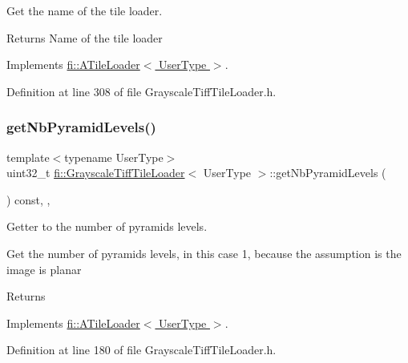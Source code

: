 Get the name of the tile loader. 

\begin{DoxyReturn}{Returns}
Name of the tile loader 
\end{DoxyReturn}


Implements \hyperlink{classfi_1_1ATileLoader_abb4cad235d57fbfb29ff5d37caf32a62}{fi\+::\+A\+Tile\+Loader$<$ User\+Type $>$}.



Definition at line 308 of file Grayscale\+Tiff\+Tile\+Loader.\+h.

\mbox{\label{classfi_1_1GrayscaleTiffTileLoader_a3a915d36a8c88a687b04ee8d5a15ecb0}} 
\subsubsection{\texorpdfstring{get\+Nb\+Pyramid\+Levels()}{getNbPyramidLevels()}}
{\footnotesize\ttfamily template$<$typename User\+Type$>$ \\
uint32\+\_\+t \hyperlink{classfi_1_1GrayscaleTiffTileLoader}{fi\+::\+Grayscale\+Tiff\+Tile\+Loader}$<$ User\+Type $>$\+::get\+Nb\+Pyramid\+Levels (\begin{DoxyParamCaption}{ }\end{DoxyParamCaption}) const\hspace{0.3cm}{\ttfamily [inline]}, {\ttfamily [override]}, {\ttfamily [virtual]}}



Getter to the number of pyramids levels. 

Get the number of pyramids levels, in this case 1, because the assumption is the image is planar \begin{DoxyReturn}{Returns}

\end{DoxyReturn}


Implements \hyperlink{classfi_1_1ATileLoader_ad6550495be22454b5f72d46c68622c37}{fi\+::\+A\+Tile\+Loader$<$ User\+Type $>$}.



Definition at line 180 of file Grayscale\+Tiff\+Tile\+Loader.\+h.

\mbox{\label{classfi_1_1GrayscaleTiffTileLoader_aa1ac88ed6b9505d5c98b9202e6f1ee6d}} 
